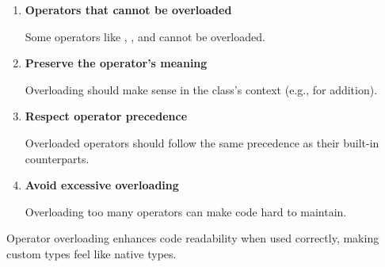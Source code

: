 \begin{tipsblock}
    \begin{enumerate}

        \item \textbf{Operators that cannot be overloaded}
        
        Some operators like \plaintt{::}, , and  cannot be overloaded.
        
        \item \textbf{Preserve the operator's meaning}
        
        Overloading should make sense in the class's context (e.g., \plaintt{+} for addition).
        
        \item \textbf{Respect operator precedence}
        
        Overloaded operators should follow the same precedence as their built-in counterparts.
        
        \item \textbf{Avoid excessive overloading}
        
        Overloading too many operators can make code hard to maintain.

    \end{enumerate}
\end{tipsblock}

Operator overloading enhances code readability when used correctly, making custom types feel like native types.
